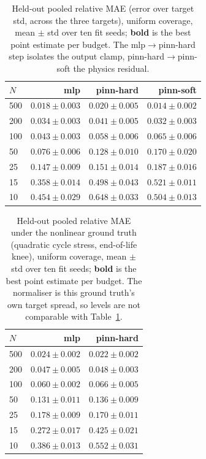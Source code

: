 \documentclass[conference]{IEEEtran}
\begin{document}
\begin{table}[htbp]
\centering
\caption{Held-out pooled relative MAE (error over target std, across the three targets), uniform coverage, mean $\pm$ std over ten fit seeds; \textbf{bold} is the best point estimate per budget. The mlp$\to$pinn-hard step isolates the output clamp, pinn-hard$\to$pinn-soft the physics residual.}
\label{tab:pinn-accuracy}
\begin{tabular}{lrrr}
\toprule
$N$ & mlp & pinn-hard & pinn-soft \\
\midrule
500 & $0.018\pm0.003$ & $0.020\pm0.005$ & $\mathbf{0.014\pm0.002}$ \\
200 & $0.034\pm0.003$ & $0.041\pm0.005$ & $\mathbf{0.032\pm0.003}$ \\
100 & $\mathbf{0.043\pm0.003}$ & $0.058\pm0.006$ & $0.065\pm0.006$ \\
50 & $\mathbf{0.076\pm0.006}$ & $0.128\pm0.010$ & $0.170\pm0.020$ \\
25 & $\mathbf{0.147\pm0.009}$ & $0.151\pm0.014$ & $0.187\pm0.016$ \\
15 & $\mathbf{0.358\pm0.014}$ & $0.498\pm0.043$ & $0.521\pm0.011$ \\
10 & $\mathbf{0.454\pm0.029}$ & $0.648\pm0.033$ & $0.504\pm0.013$ \\
\bottomrule
\end{tabular}
\end{table}

\begin{table}[htbp]
\centering
\caption{Held-out pooled relative MAE under the nonlinear ground truth (quadratic cycle stress, end-of-life knee), uniform coverage, mean $\pm$ std over ten fit seeds; \textbf{bold} is the best point estimate per budget. The normaliser is this ground truth's own target spread, so levels are not comparable with Table~\ref{tab:pinn-accuracy}.}
\label{tab:pinn-nonlinear}
\begin{tabular}{lrr}
\toprule
$N$ & mlp & pinn-hard \\
\midrule
500 & $0.024\pm0.002$ & $\mathbf{0.022\pm0.002}$ \\
200 & $\mathbf{0.047\pm0.005}$ & $0.048\pm0.003$ \\
100 & $\mathbf{0.060\pm0.002}$ & $0.066\pm0.005$ \\
50 & $\mathbf{0.131\pm0.011}$ & $0.136\pm0.009$ \\
25 & $0.178\pm0.009$ & $\mathbf{0.170\pm0.011}$ \\
15 & $\mathbf{0.272\pm0.017}$ & $0.425\pm0.021$ \\
10 & $\mathbf{0.386\pm0.013}$ & $0.552\pm0.031$ \\
\bottomrule
\end{tabular}
\end{table}
\end{document}

